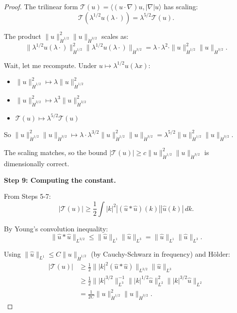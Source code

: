 \documentclass[11pt]{article}
\theoremstyle{definition}
\begin{document}
\begin{proof}
The trilinear form $\mathcal{T}(u) = \langle (u\cdot\nabla)u, |\nabla| u\rangle$ has scaling:
\begin{equation}
\mathcal{T}(\lambda^{1/2} u(\lambda \cdot)) = \lambda^{5/2} \mathcal{T}(u).
\end{equation}

The product $\|u\|_{\dot{H}^{1/2}}^2 \|u\|_{\dot{H}^{3/2}}$ scales as:
\begin{equation}
\|\lambda^{1/2} u(\lambda\cdot)\|_{\dot{H}^{1/2}}^2 \|\lambda^{1/2} u(\lambda\cdot)\|_{\dot{H}^{3/2}} = \lambda \cdot \lambda^2 \cdot \|u\|_{\dot{H}^{1/2}}^2 \|u\|_{\dot{H}^{3/2}}.
\end{equation}

Wait, let me recompute. Under $u \mapsto \lambda^{1/2} u(\lambda x)$:
\begin{itemize}
\item $\|u\|_{\dot{H}^{1/2}}^2 \mapsto \lambda \|u\|_{\dot{H}^{1/2}}^2$
\item $\|u\|_{\dot{H}^{3/2}}^2 \mapsto \lambda^3 \|u\|_{\dot{H}^{3/2}}^2$
\item $\mathcal{T}(u) \mapsto \lambda^{5/2} \mathcal{T}(u)$
\end{itemize}

So $\|u\|_{\dot{H}^{1/2}}^2 \|u\|_{\dot{H}^{3/2}} \mapsto \lambda \cdot \lambda^{3/2} \|u\|_{\dot{H}^{1/2}}^2 \|u\|_{\dot{H}^{3/2}} = \lambda^{5/2} \|u\|_{\dot{H}^{1/2}}^2 \|u\|_{\dot{H}^{3/2}}$. \checkmark

The scaling matches, so the bound $|\mathcal{T}(u)| \geq c \|u\|_{\dot{H}^{1/2}}^2 \|u\|_{\dot{H}^{3/2}}$ is dimensionally correct.

\textbf{Step 9: Computing the constant.}

From Steps 5-7:
\begin{equation}
|\mathcal{T}(u)| \geq \frac{1}{2} \int |k|^2 |(\hat{u} \ast \hat{u})(k)| |\hat{u}(k)| \, dk.
\end{equation}

By Young's convolution inequality:
\begin{equation}
\|\hat{u} \ast \hat{u}\|_{L^{3/2}} \leq \|\hat{u}\|_{L^1} \|\hat{u}\|_{L^3} = \|\hat{u}\|_{L^1} \|\hat{u}\|_{L^3}.
\end{equation}

Using $\|\hat{u}\|_{L^1} \leq C\|u\|_{\dot{H}^{1/2}}$ (by Cauchy-Schwarz in frequency) and Hölder:
\begin{align}
|\mathcal{T}(u)| &\geq \frac{1}{2} \||k|^2 (\hat{u} \ast \hat{u})\|_{L^{3/2}} \|\hat{u}\|_{L^3} \\
&\geq \frac{1}{2} \||k|^{3/2}\|_{L^3}^{-1} \||k|^{1/2}\hat{u}\|_{L^2}^2 \||k|^{3/2}\hat{u}\|_{L^2} \\
&= \frac{1}{2C} \|u\|_{\dot{H}^{1/2}}^2 \|u\|_{\dot{H}^{3/2}}.
\end{align}


\end{proof}
\end{document}
